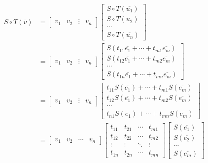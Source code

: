 \begin{commentary}
\begin{align*}
	S \circ T(\overline{v}) & =  \begin{bmatrix} v_1 & v_2 & \vdots & v_n  \end{bmatrix} \begin{bmatrix} S \circ T(\overline{u_1}) \\ S \circ T(\overline{u_2}) \\ \cdots \\ S \circ T(\overline{u_n}) \end{bmatrix} \\
	& =  \begin{bmatrix} v_1 & v_2 & \vdots & v_n  \end{bmatrix}\begin{bmatrix} S(t_{11}\overline{e_1} + \cdots + t_{m1}\overline{e_m}) \\ S(t_{12}\overline{e_1} + \cdots + t_{m2}\overline{e_m}) \\ \cdots \\ S(t_{1n}\overline{e_1} + \cdots + t_{mn}\overline{e_m}) \end{bmatrix} \\
	& =  \begin{bmatrix} v_1 & v_2 & \vdots & v_n  \end{bmatrix}\begin{bmatrix} t_{11}S(\overline{e_1}) + \cdots + t_{m1}S(\overline{e_m}) \\ t_{12}S(\overline{e_1}) + \cdots + t_{m2}S(\overline{e_m}) \\ \cdots \\ t_{n1}S(\overline{e_1}) + \cdots + t_{mn}S(\overline{e_m}) \end{bmatrix} \\
	& = \begin{bmatrix} v_1 & v_2 & \cdots & v_n  \end{bmatrix} \begin{bmatrix} t_{11} & t_{21} & \cdots & t_{m1} \\ t_{12} & t_{22} & \cdots & t_{m2} \\ \vdots & \vdots & \ddots & \vdots \\ t_{1n} & t_{2n} & \cdots & t_{mn} \end{bmatrix} \begin{bmatrix} S(\overline{e_1}) \\ S(\overline{e_2}) \\ \cdots \\ S(\overline{e_m}) \end{bmatrix} \\

\end{align*}
\end{commentary}
